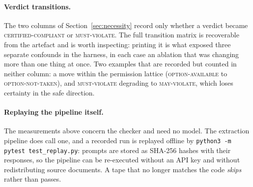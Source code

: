 \paragraph{Verdict transitions.}
The two columns of Section~\ref{sec:necessity} record only whether a verdict
became \textsc{certified-compliant} or \textsc{must-violate}. The full
transition matrix is recoverable from the artefact and is worth inspecting:
printing it is what exposed three separate confounds in the harness, in each
case an ablation that was changing more than one thing at once. Two examples
that are recorded but counted in neither column: a move within the permission
lattice (\textsc{option-available} to \textsc{option-not-taken}), and
\textsc{must-violate} degrading to \textsc{may-violate}, which loses certainty
in the safe direction.

\paragraph{Replaying the pipeline itself.}
The measurements above concern the checker and need no model. The extraction
pipeline does call one, and a recorded run is replayed offline by
\texttt{python3 -m pytest test\_replay.py}: prompts are stored as SHA-256
hashes with their responses, so the pipeline can be re-executed without an API
key and without redistributing source documents. A tape that no longer matches
the code \emph{skips} rather than passes.
